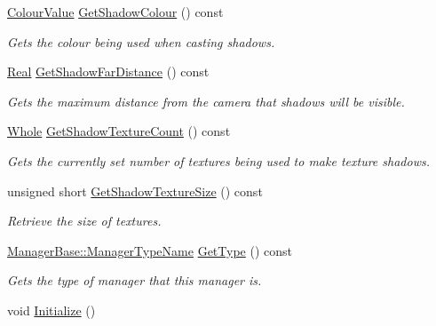 \begin{DoxyCompactItemize}
\hyperlink{classMezzanine_1_1ColourValue}{ColourValue} \hyperlink{classMezzanine_1_1SceneManager_aeaba5d32f77249821ec4ec85cecb1522}{GetShadowColour} () const 
\begin{DoxyCompactList}\small\item\em Gets the colour being used when casting shadows. \item\end{DoxyCompactList}\item 
\hyperlink{namespaceMezzanine_a726731b1a7df72bf3583e4a97282c6f6}{Real} \hyperlink{classMezzanine_1_1SceneManager_a244de596b02c103c4b2cb2417bd8fdbb}{GetShadowFarDistance} () const 
\begin{DoxyCompactList}\small\item\em Gets the maximum distance from the camera that shadows will be visible. \item\end{DoxyCompactList}\item 
\hyperlink{namespaceMezzanine_adcbb6ce6d1eb4379d109e51171e2e493}{Whole} \hyperlink{classMezzanine_1_1SceneManager_aa863b17f316b6b29592b4be50136b543}{GetShadowTextureCount} () const 
\begin{DoxyCompactList}\small\item\em Gets the currently set number of textures being used to make texture shadows. \item\end{DoxyCompactList}\item 
unsigned short \hyperlink{classMezzanine_1_1SceneManager_aece91693b0d176d0c6ec80f3384ee834}{GetShadowTextureSize} () const 
\begin{DoxyCompactList}\small\item\em Retrieve the size of textures. \item\end{DoxyCompactList}\item 
\hyperlink{classMezzanine_1_1ManagerBase_a08cecf5169cad3e82be81a3a159b0b6e}{ManagerBase::ManagerTypeName} \hyperlink{classMezzanine_1_1SceneManager_ad10c4317af4a2c6fbbfc151e8c609570}{GetType} () const 
\begin{DoxyCompactList}\small\item\em Gets the type of manager that this manager is. \item\end{DoxyCompactList}\item 
\hypertarget{classMezzanine_1_1SceneManager_a8a3b5cb55a06669d0fe64510c1b1a854}{
void \hyperlink{classMezzanine_1_1SceneManager_a8a3b5cb55a06669d0fe64510c1b1a854}{Initialize} ()}
\label{classMezzanine_1_1SceneManager_a8a3b5cb55a06669d0fe64510c1b1a854}


\end{DoxyCompactItemize}
